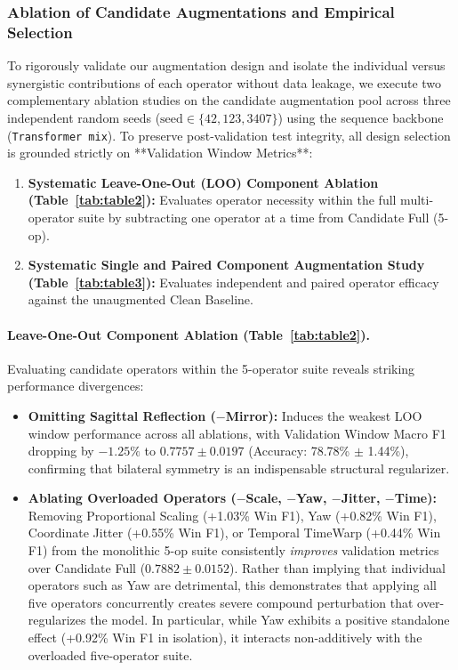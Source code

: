 \documentclass[preprint,12pt]{elsarticle}
\begin{document}
\subsubsection{Ablation of Candidate Augmentations and Empirical Selection}
\label{sec:exp_aug}

To rigorously validate our augmentation design and isolate the individual versus synergistic contributions of each operator without data leakage, we execute two complementary ablation studies on the candidate augmentation pool across three independent random seeds ($\text{seed} \in \{42, 123, 3407\}$) using the sequence backbone (\texttt{Transformer mix}). To preserve post-validation test integrity, all design selection is grounded strictly on **Validation Window Metrics**:
\begin{enumerate}
    \item \textbf{Systematic Leave-One-Out (LOO) Component Ablation (Table~\ref{tab:table2}):} Evaluates operator necessity within the full multi-operator suite by subtracting one operator at a time from Candidate Full (5-op).
    \item \textbf{Systematic Single and Paired Component Augmentation Study (Table~\ref{tab:table3}):} Evaluates independent and paired operator efficacy against the unaugmented Clean Baseline.
\end{enumerate}

\paragraph{Leave-One-Out Component Ablation (Table~\ref{tab:table2}).}
Evaluating candidate operators within the 5-operator suite reveals striking performance divergences:
\begin{itemize}
    \item \textbf{Omitting Sagittal Reflection ($-$Mirror):} Induces the weakest LOO window performance across all ablations, with Validation Window Macro F1 dropping by $-1.25\%$ to $0.7757 \pm 0.0197$ (Accuracy: 78.78\% $\pm$ 1.44\%), confirming that bilateral symmetry is an indispensable structural regularizer.
    \item \textbf{Ablating Overloaded Operators ($-$Scale, $-$Yaw, $-$Jitter, $-$Time):} Removing Proportional Scaling (+1.03\% Win F1), Yaw (+0.82\% Win F1), Coordinate Jitter (+0.55\% Win F1), or Temporal TimeWarp (+0.44\% Win F1) from the monolithic 5-op suite consistently \textit{improves} validation metrics over Candidate Full ($0.7882 \pm 0.0152$). Rather than implying that individual operators such as Yaw are detrimental, this demonstrates that applying all five operators concurrently creates severe compound perturbation that over-regularizes the model. In particular, while Yaw exhibits a positive standalone effect (+0.92\% Win F1 in isolation), it interacts non-additively with the overloaded five-operator suite.
\end{itemize}
\end{document}
